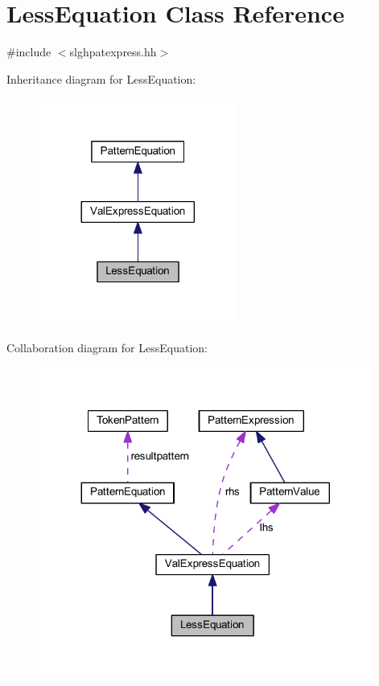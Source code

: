 \hypertarget{class_less_equation}{}\section{Less\+Equation Class Reference}
\label{class_less_equation}


{\ttfamily \#include $<$slghpatexpress.\+hh$>$}



Inheritance diagram for Less\+Equation\+:
\nopagebreak
\begin{figure}[H]
\begin{center}
\leavevmode
\includegraphics[width=185pt]{class_less_equation__inherit__graph}
\end{center}
\end{figure}


Collaboration diagram for Less\+Equation\+:
\nopagebreak
\begin{figure}[H]
\begin{center}
\leavevmode
\includegraphics[width=311pt]{class_less_equation__coll__graph}
\end{center}
\end{figure}
